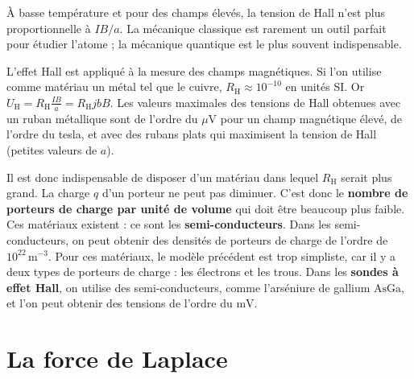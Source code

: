 \documentclass[11pt,a4paper]{article}
\newcommand{\UH}{U_{\mathrm H}}
\newcommand{\RH}{R_{\mathrm H}}
\newcommand{\unite}[1]{\,\mathrm{#1}}
\begin{document}
À basse température et pour des champs élevés, la tension de Hall n'est plus proportionnelle
à \(IB/a\). La mécanique classique est rarement un outil parfait pour étudier l'atome ;
la mécanique quantique est le plus souvent indispensable.

L'effet Hall est appliqué à la mesure des champs magnétiques. Si l'on utilise comme matériau
un métal tel que le cuivre, \(\RH\approx10^{-10}\) en unités SI. Or
\(\displaystyle\UH=\RH\frac{IB}{a}=\RH jbB\).
Les valeurs maximales des tensions de Hall obtenues avec un ruban métallique sont de l'ordre
du \(\mu\mathrm V\) pour un champ magnétique élevé, de l'ordre du tesla, et avec des rubans
plats qui maximisent la tension de Hall (petites valeurs de \(a\)).

Il est donc indispensable de disposer d'un matériau dans lequel \(\RH\) serait plus grand.
La charge \(q\) d'un porteur ne peut pas diminuer. C'est donc le \textbf{nombre de porteurs
de charge par unité de volume} qui doit être beaucoup plus faible. Ces matériaux existent :
ce sont les \textbf{semi-conducteurs}. Dans les semi-conducteurs, on peut obtenir des densités
de porteurs de charge de l'ordre de \(10^{22}\unite{m^{-3}}\). Pour ces matériaux, le modèle
précédent est trop simpliste, car il y a deux types de porteurs de charge : les électrons et
les trous. Dans les \textbf{sondes à effet Hall}, on utilise des semi-conducteurs, comme
l'arséniure de gallium \(\mathrm{AsGa}\), et l'on peut obtenir des tensions de l'ordre du
\(\mathrm{mV}\).

\section{La force de Laplace}\label{sec:laplace}
\end{document}
